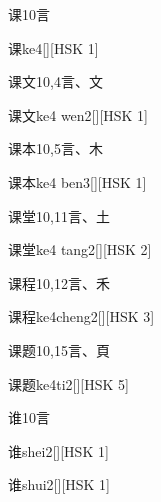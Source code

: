 \begin{entry}{课}{10}{⾔}
  \begin{phonetics}{课}{ke4}[][HSK 1]
  \end{phonetics}
\end{entry}

\begin{entry}{课文}{10,4}{⾔、⽂}
  \begin{phonetics}{课文}{ke4 wen2}[][HSK 1]
  \end{phonetics}
\end{entry}

\begin{entry}{课本}{10,5}{⾔、⽊}
  \begin{phonetics}{课本}{ke4 ben3}[][HSK 1]
  \end{phonetics}
\end{entry}

\begin{entry}{课堂}{10,11}{⾔、⼟}
  \begin{phonetics}{课堂}{ke4 tang2}[][HSK 2]
  \end{phonetics}
\end{entry}

\begin{entry}{课程}{10,12}{⾔、⽲}
  \begin{phonetics}{课程}{ke4cheng2}[][HSK 3]
  \end{phonetics}
\end{entry}

\begin{entry}{课题}{10,15}{⾔、⾴}
  \begin{phonetics}{课题}{ke4ti2}[][HSK 5]
  \end{phonetics}
\end{entry}

\begin{entry}{谁}{10}{⾔}
  \begin{phonetics}{谁}{shei2}[][HSK 1]
  \end{phonetics}
  \begin{phonetics}{谁}{shui2}[][HSK 1]
  \end{phonetics}
\end{entry}

